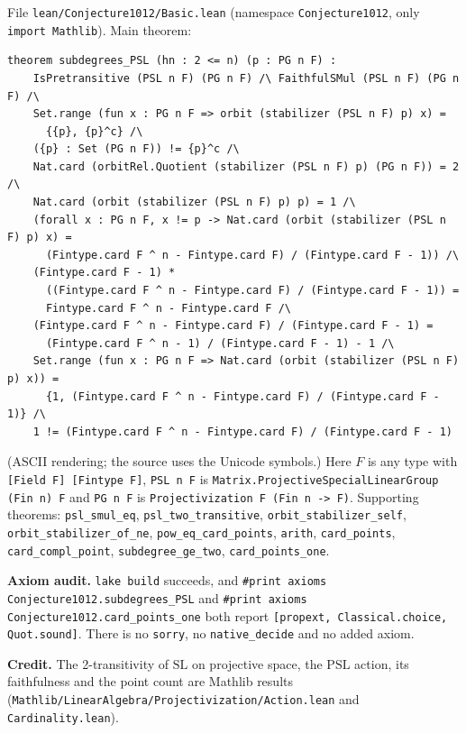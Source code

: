 \documentclass[11pt]{article}
\theoremstyle{definition}
\newcommand{\PSL}{\mathrm{PSL}}
\newcommand{\SL}{\mathrm{SL}}
\begin{document}
File \texttt{lean/Conjecture1012/Basic.lean} (namespace \texttt{Conjecture1012}, only
\texttt{import Mathlib}). Main theorem:
{\small
\begin{verbatim}
theorem subdegrees_PSL (hn : 2 <= n) (p : PG n F) :
    IsPretransitive (PSL n F) (PG n F) /\ FaithfulSMul (PSL n F) (PG n F) /\
    Set.range (fun x : PG n F => orbit (stabilizer (PSL n F) p) x) =
      {{p}, {p}^c} /\
    ({p} : Set (PG n F)) != {p}^c /\
    Nat.card (orbitRel.Quotient (stabilizer (PSL n F) p) (PG n F)) = 2 /\
    Nat.card (orbit (stabilizer (PSL n F) p) p) = 1 /\
    (forall x : PG n F, x != p -> Nat.card (orbit (stabilizer (PSL n F) p) x) =
      (Fintype.card F ^ n - Fintype.card F) / (Fintype.card F - 1)) /\
    (Fintype.card F - 1) *
      ((Fintype.card F ^ n - Fintype.card F) / (Fintype.card F - 1)) =
      Fintype.card F ^ n - Fintype.card F /\
    (Fintype.card F ^ n - Fintype.card F) / (Fintype.card F - 1) =
      (Fintype.card F ^ n - 1) / (Fintype.card F - 1) - 1 /\
    Set.range (fun x : PG n F => Nat.card (orbit (stabilizer (PSL n F) p) x)) =
      {1, (Fintype.card F ^ n - Fintype.card F) / (Fintype.card F - 1)} /\
    1 != (Fintype.card F ^ n - Fintype.card F) / (Fintype.card F - 1)
\end{verbatim}
}
(ASCII rendering; the source uses the Unicode symbols.) Here $F$ is any type with
\texttt{[Field F] [Fintype F]}, \texttt{PSL n F} is
\texttt{Matrix.ProjectiveSpecialLinearGroup (Fin n) F} and \texttt{PG n F} is
\texttt{Projectivization F (Fin n -> F)}.
Supporting theorems: \texttt{psl\_smul\_eq}, \texttt{psl\_two\_transitive},
\texttt{orbit\_stabilizer\_self}, \texttt{orbit\_stabilizer\_of\_ne}, \texttt{pow\_eq\_card\_points},
\texttt{arith}, \texttt{card\_points}, \texttt{card\_compl\_point}, \texttt{subdegree\_ge\_two},
\texttt{card\_points\_one}.

\textbf{Axiom audit.} \texttt{lake build} succeeds, and
\texttt{\#print axioms Conjecture1012.subdegrees\_PSL} and
\texttt{\#print axioms Conjecture1012.card\_points\_one} both report
\texttt{[propext, Classical.choice, Quot.sound]}. There is no \texttt{sorry}, no
\texttt{native\_decide} and no added axiom.

\textbf{Credit.} The 2-transitivity of $\SL$ on projective space, the $\PSL$ action, its
faithfulness and the point count are Mathlib results
(\texttt{Mathlib/LinearAlgebra/Projectivization/Action.lean} and \texttt{Cardinality.lean}).
\end{document}
